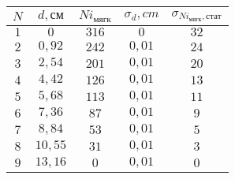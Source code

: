 \begin{tabular}{| c | c | c | c | c |}
\hline
$N$ & $d, см$ & $Ni_{мягк}$ & $\sigma_d, cm$ & $\sigma_{Ni_{мягк}, стат}$\\
\hline
$1$ & $0$ & $316$ & $0$ & $32$\\
\hline
$2$ & $0,92$ & $242$ & $0,01$ & $24$\\
\hline
$3$ & $2,54$ & $201$ & $0,01$ & $20$\\
\hline
$4$ & $4,42$ & $126$ & $0,01$ & $13$\\
\hline
$5$ & $5,68$ & $113$ & $0,01$ & $11$\\
\hline
$6$ & $7,36$ & $87$ & $0,01$ & $9$\\
\hline
$7$ & $8,84$ & $53$ & $0,01$ & $5$\\
\hline
$8$ & $10,55$ & $31$ & $0,01$ & $3$\\
\hline
$9$ & $13,16$ & $0$ & $0,01$ & $0$\\
\hline
\end{tabular}
